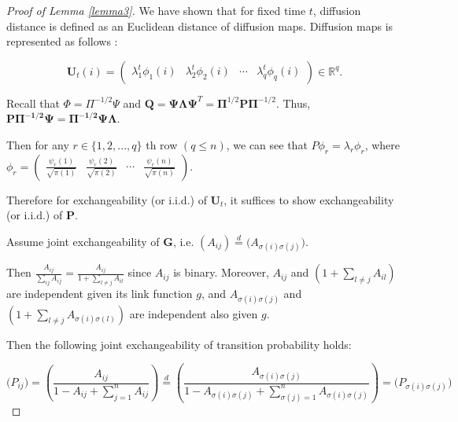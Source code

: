 \documentclass[12pt]{article}
\theoremstyle{definition}
\begin{document}
\begin{proof}[Proof of Lemma \ref{lemma3}]

We have shown that for fixed time $t$, diffusion distance is defined as an Euclidean distance of diffusion maps. Diffusion maps is represented as follows :

\begin{equation}
\boldsymbol{U}_{t}(i) = \begin{pmatrix} \lambda^{t}_{1} \phi_{1}(i) & \lambda^{t}_{2} \phi_{2} (i)  & \cdots & \lambda^{t}_{q} \phi_{q}(i) \end{pmatrix} \in \mathbb{R}^{q}.
\end{equation}

Recall that $\Phi = \Pi^{-1/2}\Psi$ and $\mathbf{Q}=\mathbf{\Psi}\mathbf{\Lambda}\mathbf{\Psi}^{T} = \mathbf{\Pi}^{1/2} \mathbf{P} \mathbf{\Pi}^{-1/2}$. 
Thus, $\mathbf{P \Pi^{-1/2} \Psi = \Pi^{-1/2} \Psi \Lambda}$. 


Then for any $r \in \{1,2, ... , q \}$ th row $(q \leq n)$, we can see that $P \phi_{r} = \lambda_{r} \phi_{r}$, where $\phi_{r} = \begin{pmatrix}  \frac{\psi_{r}(1)}{\sqrt{\pi(1)}} & \frac{\psi_{r}(2)}{\sqrt{\pi(2)}} & \cdots & \frac{\psi_{r}(n)}{\sqrt{\pi(n)}} \end{pmatrix}$.

Therefore for exchangeability (or i.i.d.) of $\mathbf{U}_{t}$, it suffices to show exchangeability (or i.i.d.) of $\mathbf{P}$.

Assume joint exchangeability of $\mathbf{G}$, i.e. $(A_{ij}) \stackrel{d}{=} \big( A_{\sigma(i) \sigma(j)} \big)$. 

Then $\frac{A_{ij}}{\sum\limits_{ij} A_{ij}} = \frac{A_{ij}}{ 1 + \sum\limits_{l \neq j} A_{il}}$ since $A_{ij}$ is binary. Moreover, $A_{ij}$ and $(1 + \sum\limits_{l \neq j} A_{il})$ are independent given its link function $g$, and $A_{\sigma(i) \sigma(j)}$ and $(1 + \sum\limits_{l \neq j} A_{\sigma(i) \sigma(l)})$ are independent also given $g$.

Then the following joint exchangeability of transition probability holds:

\begin{equation}
\big( P_{ij} \big) = \left(  \frac{A_{ij}}{1 - A_{ij} + \sum\limits_{j=1}^{n} A_{ij} } \right)  \stackrel{d}{=} \left( \frac{A_{\sigma(i) \sigma(j)} }{1 - A_{\sigma(i) \sigma(j)} + \sum\limits_{\sigma(j) = 1}^{n} A_{\sigma(i) \sigma(j)} } \right) = \big( P_{\sigma(i) \sigma(j)} \big)
\end{equation}


\end{proof}
\end{document}
